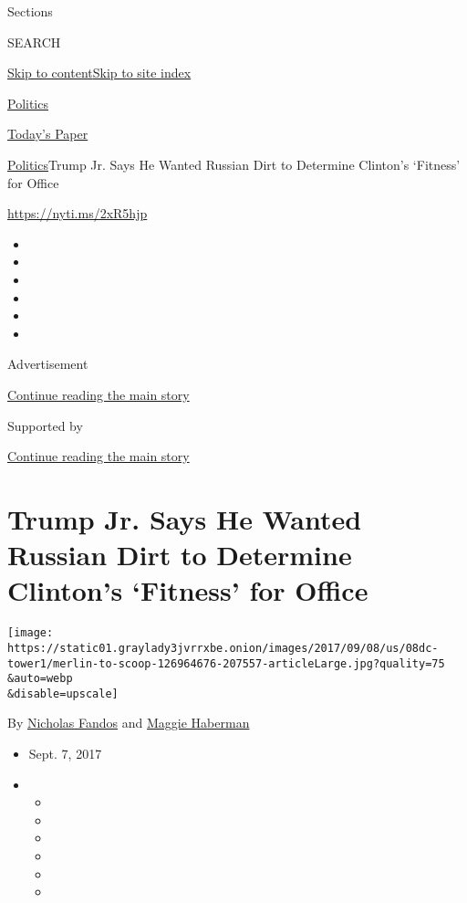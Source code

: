 Sections

SEARCH

\protect\hyperlink{site-content}{Skip to
content}\protect\hyperlink{site-index}{Skip to site index}

\href{https://www.nytimes3xbfgragh.onion/section/politics}{Politics}

\href{https://myaccount.nytimes3xbfgragh.onion/auth/login?response_type=cookie\&client_id=vi}{}

\href{https://www.nytimes3xbfgragh.onion/section/todayspaper}{Today's
Paper}

\href{/section/politics}{Politics}\textbar{}Trump Jr. Says He Wanted
Russian Dirt to Determine Clinton's `Fitness' for Office

\url{https://nyti.ms/2xR5hjp}

\begin{itemize}
\item
\item
\item
\item
\item
\item
\end{itemize}

Advertisement

\protect\hyperlink{after-top}{Continue reading the main story}

Supported by

\protect\hyperlink{after-sponsor}{Continue reading the main story}

\hypertarget{trump-jr-says-he-wanted-russian-dirt-to-determine-clintons-fitness-for-office}{%
\section{Trump Jr. Says He Wanted Russian Dirt to Determine Clinton's
`Fitness' for
Office}\label{trump-jr-says-he-wanted-russian-dirt-to-determine-clintons-fitness-for-office}}

\texttt{[image: https://static01.graylady3jvrrxbe.onion/images/2017/09/08/us/08dc-tower1/merlin-to-scoop-126964676-207557-articleLarge.jpg?quality=75\\\&auto=webp\\\&disable=upscale]}

By \href{https://www.nytimes3xbfgragh.onion/by/nicholas-fandos}{Nicholas
Fandos} and
\href{http://www.nytimes3xbfgragh.onion/by/maggie-haberman}{Maggie
Haberman}

\begin{itemize}
\item
  Sept. 7, 2017
\item
  \begin{itemize}
  \item
  \item
  \item
  \item
  \item
  \item
  \end{itemize}
\end{itemize}

